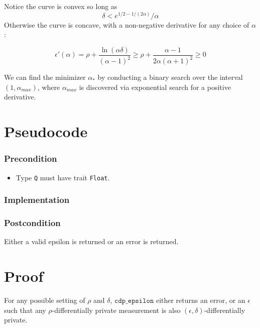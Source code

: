 \documentclass{article}
\begin{document}
Notice the curve is convex so long as 
\begin{equation}
    \delta < e^{1/2 - 1/(2\alpha)}/\alpha
\end{equation}
Otherwise the curve is concave, with a non-negative derivative for any choice of $\alpha$: 

\begin{equation}
    \epsilon'(\alpha) = \rho + \frac{\ln(\alpha\delta)}{(\alpha - 1)^2} 
    \geq \rho + \frac{\alpha - 1}{2\alpha (\alpha + 1)^2} 
    \geq 0
\end{equation}

We can find the minimizer $\alpha_{*}$ by conducting a binary search over the interval $(1, \alpha_{max})$, where $\alpha_{max}$ is discovered via exponential search for a positive derivative.


\section{Pseudocode}
\subsubsection*{Precondition}

\begin{itemize}
    \item Type \texttt{Q} must have trait \texttt{Float}.
\end{itemize}

\subsubsection*{Implementation}        


\subsubsection*{Postcondition}
Either a valid epsilon is returned or an error is returned.

\section{Proof}

\begin{theorem}
For any possible setting of $\rho$ and $\delta$, $\texttt{cdp\_epsilon}$ either returns an error, or an $\epsilon$ such that any $\rho$-differentially private measurement is also $(\epsilon, \delta)$-differentially private.
\end{theorem}
\end{document}
